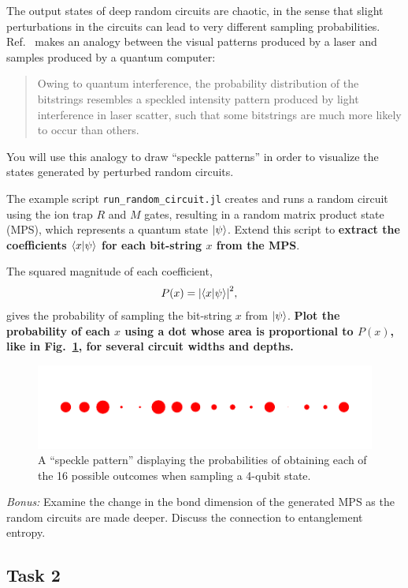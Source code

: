 \documentclass[12pt]{article}
\begin{document}
The output states of deep random circuits are chaotic, in the sense that slight perturbations in the circuits can lead to very different sampling probabilities.
Ref.~ makes an analogy between the visual patterns produced by a laser and samples produced by a quantum computer:
\begin{quote}
Owing to quantum interference, the probability distribution of the bitstrings resembles a speckled intensity pattern produced by light interference in laser scatter, such that some bitstrings are much more likely to occur than others.
\end{quote}
You will use this analogy to draw ``speckle patterns'' in order to visualize the states generated by perturbed random circuits.

The example script \texttt{run\_random\_circuit.jl} creates and runs a random circuit using the ion trap $R$ and $M$ gates, resulting in a random matrix product state (MPS), which represents a quantum state $\ket{\psi}$.
Extend this script to \textbf{extract the coefficients $\ip{x}{\psi}$ for each bit-string $x$ from the MPS}.

The squared magnitude of each coefficient,
\begin{align}
	P(x)
	&= \abs{\ip{x}{\psi}}^2,
\end{align}
gives the probability of sampling the bit-string $x$ from $\ket{\psi}$.
\textbf{Plot the probability of each $x$ using a dot whose area is proportional to $P(x)$, like in Fig.~\ref{fig:speckle}, for several circuit widths and depths.}

\begin{figure}
	\centering
	\includegraphics{speckle_N=004,depth=032}
	\caption{
		A ``speckle pattern'' displaying the probabilities of obtaining each of the 16 possible outcomes when sampling a 4-qubit state.
	}
	\label{fig:speckle}
\end{figure}

\medskip \noindent \textit{Bonus:}
Examine the change in the bond dimension of the generated MPS as the random circuits are made deeper.
Discuss the connection to entanglement entropy.


\subsection*{Task 2}
\end{document}
